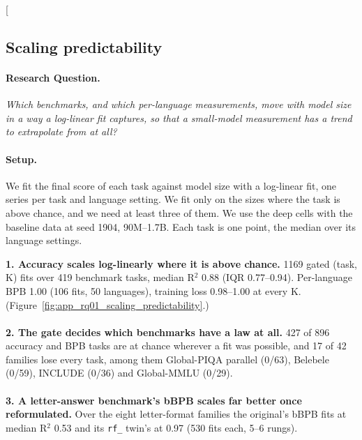 \clearpage
\twocolumn[{%
\subsection{Scaling predictability}
\label{app:rq01_scaling_predictability}

\noindent\begin{minipage}[t]{0.485\textwidth}
\vspace{0pt}
\paragraph{Research Question.} \emph{Which benchmarks, and which per-language measurements, move with model size in a way a log-linear fit captures, so that a small-model measurement has a trend to extrapolate from at all?}

\paragraph{Setup.} We fit the final score of each task against model size with a log-linear fit, one series per task and language setting. We fit only on the sizes where the task is above chance, and we need at least three of them. We use the deep cells with the baseline data at seed 1904, 90M--1.7B. Each task is one point, the median over its language settings.
\end{minipage}\hfill
\begin{minipage}[t]{0.485\textwidth}
\vspace{0pt}
\begin{rqfinding}
\textbf{1. Accuracy scales log-linearly where it is above chance.} 1169 gated (task, K) fits over 419 benchmark tasks, median R$^2$ 0.88 (IQR 0.77--0.94). Per-language BPB 1.00 (106 fits, 50 languages), training loss 0.98--1.00 at every K. (Figure~\ref{fig:app_rq01_scaling_predictability}.)
\\
\\
\textbf{2. The gate decides which benchmarks have a law at all.} 427 of 896 accuracy and BPB tasks are at chance wherever a fit was possible, and 17 of 42 families lose every task, among them Global-PIQA parallel (0/63), Belebele (0/59), INCLUDE (0/36) and Global-MMLU (0/29).
\\
\\
\textbf{3. A letter-answer benchmark's bBPB scales far better once reformulated.} Over the eight letter-format families the original's bBPB fits at median R$^2$ 0.53 and its \texttt{rf\_} twin's at 0.97 (530 fits each, 5--6 rungs).
\end{rqfinding}
\end{minipage}

}
